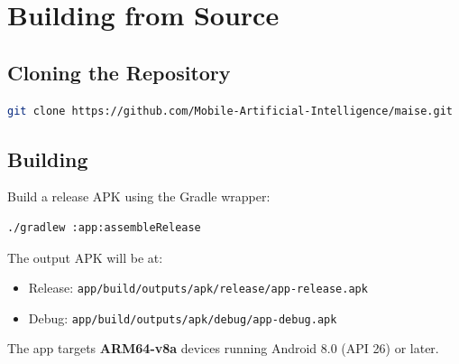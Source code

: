 \documentclass[12pt,a4paper]{article}
\begin{document}
\section{Building from Source}
\label{sec:building}

\subsection{Cloning the Repository}

\begin{lstlisting}[language=bash]
git clone https://github.com/Mobile-Artificial-Intelligence/maise.git
\end{lstlisting}

\subsection{Building}

Build a release APK using the Gradle wrapper:

\begin{lstlisting}[language=bash]
./gradlew :app:assembleRelease
\end{lstlisting}

The output APK will be at:

\begin{itemize}[noitemsep]
    \item Release: \texttt{app/build/outputs/apk/release/app-release.apk}
    \item Debug: \texttt{app/build/outputs/apk/debug/app-debug.apk}
\end{itemize}

The app targets \textbf{ARM64-v8a} devices running Android 8.0 (API 26) or later.
\end{document}
